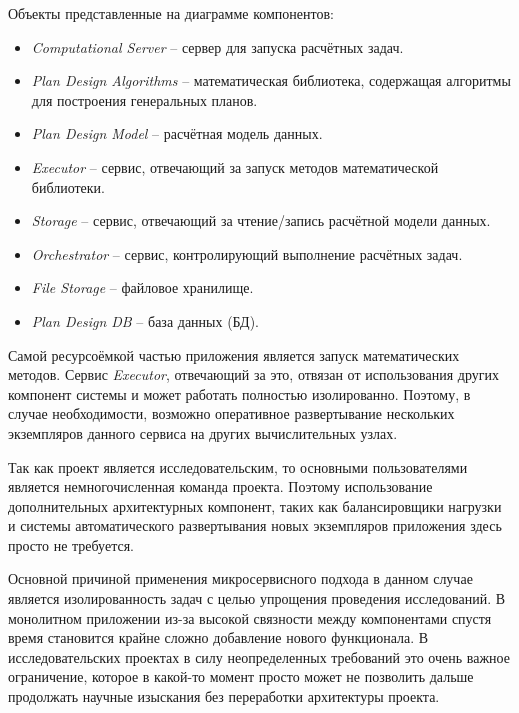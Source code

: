 \noindent Объекты представленные на диаграмме компонентов:
\begin{itemize}
	\item \textit{Computational Server} -- сервер для запуска расчётных задач.
	\item \textit{Plan Design Algorithms} -- математическая библиотека, содержащая алгоритмы
	для построения генеральных планов.
	\item \textit{Plan Design Model} -- расчётная модель данных.
	\item \textit{Executor} -- сервис, отвечающий за запуск методов математической библиотеки.
	\item \textit{Storage} -- сервис, отвечающий за чтение/запись расчётной модели данных.
	\item \textit{Orchestrator} -- сервис, контролирующий выполнение расчётных задач.
	\item \textit{File Storage} -- файловое хранилище.
	\item \textit{Plan Design DB} -- база данных (БД).
\end{itemize}

Самой ресурсоёмкой частью приложения является запуск математических методов.
Сервис \textit{Executor}, отвечающий за это, отвязан от использования других компонент системы
и может работать полностью изолированно.
Поэтому, в случае необходимости, возможно оперативное развертывание нескольких экземпляров данного сервиса
на других вычислительных узлах.

Так как проект является исследовательским, то основными пользователями является немногочисленная команда проекта.
Поэтому использование дополнительных архитектурных компонент,
таких как балансировщики нагрузки и системы автоматического развертывания новых экземпляров приложения
здесь просто не требуется.

Основной причиной применения микросервисного подхода в данном случае является изолированность задач с целью
упрощения проведения исследований.
В монолитном приложении из-за высокой связности между компонентами спустя время становится крайне сложно добавление
нового функционала. В исследовательских проектах в силу неопределенных требований это очень важное ограничение,
которое в какой-то момент просто может не позволить дальше продолжать
научные изыскания без переработки архитектуры проекта.

